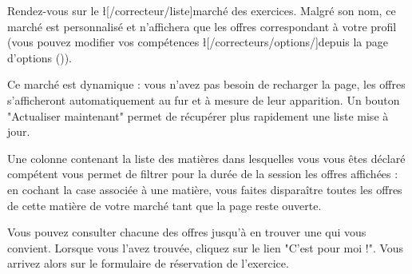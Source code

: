 ﻿Rendez-vous sur le \l[/correcteur/liste]{marché des exercices}. Malgré son nom, ce marché est personnalisé et n'affichera que les offres correspondant à votre profil (vous pouvez modifier vos compétences \l[/correcteurs/options/]{depuis la page d'options} ()).

Ce marché est dynamique : vous n'avez pas besoin de recharger la page, les offres s'afficheront automatiquement au fur et à mesure de leur apparition. Un bouton "Actualiser maintenant" permet de récupérer plus rapidement une liste mise à jour.

Une colonne contenant la liste des matières dans lesquelles vous vous êtes déclaré compétent vous permet de filtrer pour la durée de la session les offres affichées : en cochant la case associée à une matière, vous faites disparaître toutes les offres de cette matière de votre marché tant que la page reste ouverte.

Vous pouvez consulter chacune des offres jusqu'à en trouver une qui vous convient.
Lorsque vous l'avez trouvée, cliquez sur le lien "C'est pour moi !".
Vous arrivez alors sur le formulaire de réservation de l'exercice.